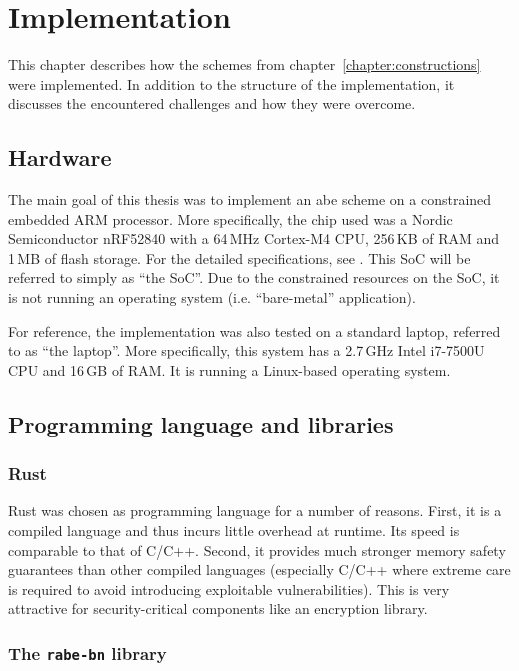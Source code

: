 \chapter{Implementation}

This chapter describes how the schemes from chapter~\ref{chapter:constructions} were implemented.
In addition to the structure of the implementation, it discusses the encountered challenges and how they were overcome.

\section{Hardware}

The main goal of this thesis was to implement an \acrshort{abe} scheme on a constrained embedded ARM processor.
More specifically, the chip used was a Nordic Semiconductor nRF52840 with a 64\,MHz Cortex-M4 CPU, 256\,KB of RAM and 1\,MB of flash storage.
For the detailed specifications, see \cite{nordic_semiconductor_nrf52840_nodate}.
This SoC will be referred to simply as ``the SoC''.
Due to the constrained resources on the SoC, it is not running an operating system (i.e. ``bare-metal'' application).

For reference, the implementation was also tested on a standard laptop, referred to as ``the laptop''.
More specifically, this system has a 2.7\,GHz Intel i7-7500U CPU and 16\,GB of RAM.
It is running a Linux-based operating system.

\section{Programming language and libraries}

\subsection*{Rust}

Rust was chosen as programming language for a number of reasons.
First, it is a compiled language and thus incurs little overhead at runtime. Its speed is comparable to that of C/C++.
Second, it provides much stronger memory safety guarantees than other compiled languages (especially C/C++ where extreme care is required to avoid introducing exploitable vulnerabilities).
This is very attractive for security-critical components like an encryption library.

\subsection*{The \texttt{rabe-bn} library}

